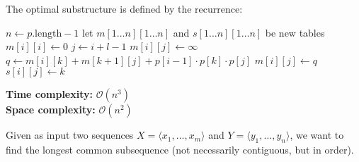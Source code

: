 \documentclass[a4paper,landscape]{article}
\begin{document}
\begin{multicols}{7}
The optimal substructure is defined by the recurrence:


\begin{algorithmic}[1]
        \State $n \gets p.\text{length} - 1$
        \State let $m[1 \dots n][1 \dots n]$ and $s[1 \dots n][1 \dots n]$ be new tables
            \State $m[i][i] \gets 0$
        \EndFor
         
                \State $j \gets i + l - 1$
                \State $m[i][j] \gets \infty$
                    \State $q \gets m[i][k] + m[k + 1][j] + p[i - 1] \cdot p[k] \cdot p[j]$
                        \State $m[i][j] \gets q$
                        \State $s[i][j] \gets k$ 
                    \EndIf
                \EndFor
            \EndFor
        \EndFor
    \EndProcedure
\end{algorithmic}

\textbf{Time complexity:} $\mathcal{O}(n^3)$ \quad \\
\textbf{Space complexity:} $\mathcal{O}(n^2)$
\endtcolorbox

\tcolorbox[mybox={Longest Common Subsequence}]
Given as input two sequences $X = \langle x_1, \dots, x_m \rangle$ and $Y = \langle y_1, \dots, y_n \rangle$, we want to find the longest common subsequence (not necessarily contiguous, but in order).


\end{multicols}
\end{document}
